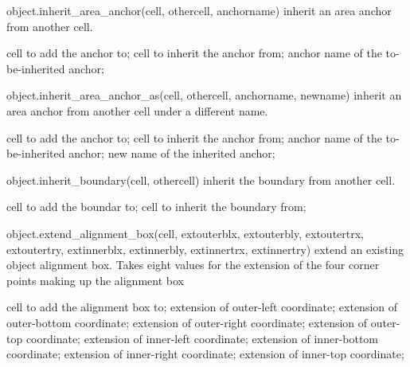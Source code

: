 \begin{APIfunc}{object.inherit\_area\_anchor(cell, othercell, anchorname)}
    inherit an area anchor from another cell.
    \begin{APIparameters}
            cell to add the anchor to;
            cell to inherit the anchor from;
            anchor name of the to-be-inherited anchor;
    \end{APIparameters}
\end{APIfunc}
\begin{APIfunc}{object.inherit\_area\_anchor\_as(cell, othercell, anchorname, newname)}
    inherit an area anchor from another cell under a different name.
    \begin{APIparameters}
            cell to add the anchor to;
            cell to inherit the anchor from;
            anchor name of the to-be-inherited anchor;
            new name of the inherited anchor;
    \end{APIparameters}
\end{APIfunc}
\begin{APIfunc}{object.inherit\_boundary(cell, othercell)}
    inherit the boundary from another cell.
    \begin{APIparameters}
            cell to add the boundar to;
            cell to inherit the boundary from;
    \end{APIparameters}
\end{APIfunc}
\begin{APIfunc}{object.extend\_alignment\_box(cell, extouterblx, extouterbly, extoutertrx, extoutertry, extinnerblx, extinnerbly, extinnertrx, extinnertry)}
    extend an existing object alignment box. Takes eight values for the extension of the four corner points making up the alignment box
    \begin{APIparameters}
            cell to add the alignment box to;
            extension of outer-left coordinate;
            extension of outer-bottom coordinate;
            extension of outer-right coordinate;
            extension of outer-top coordinate;
            extension of inner-left coordinate;
            extension of inner-bottom coordinate;
            extension of inner-right coordinate;
            extension of inner-top coordinate;
    \end{APIparameters}
\end{APIfunc}

